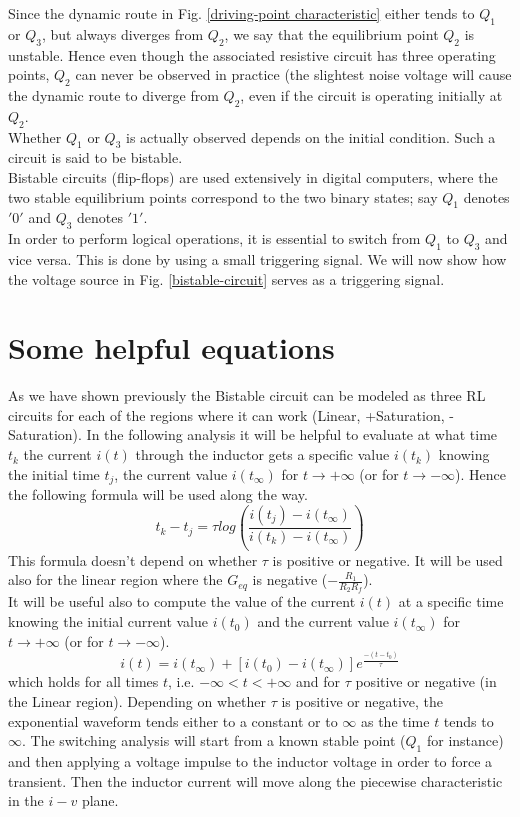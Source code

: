 \documentclass[12pt,a4paper,tweside,onehalfspacing]{article}
\begin{document}
Since the dynamic route in Fig. \ref{driving-point characteristic} either tends to $Q_1$ or $Q_3$, but always diverges from $Q_2$, we say that the equilibrium point $Q_2$ is unstable. Hence even though the associated resistive circuit has three operating points, $Q_2$ can never be observed in practice (the slightest noise voltage will cause the dynamic route to diverge from $Q_2$, even if the circuit is operating initially at $Q_2$.\\
Whether $Q_1$ or $Q_3$ is actually observed depends on the initial condition. Such a circuit is said to be bistable.\\
Bistable circuits (flip-flops) are used extensively in digital computers, where the two stable equilibrium points correspond to the two binary states; say $Q_1$ denotes $'0'$ and $Q_3$ denotes $'1'$.\\
In order to perform logical operations, it is essential to switch from $Q_1$ to $Q_3$ and vice versa. This is done by using a small triggering signal. We will now show how the voltage source in Fig. \ref{bistable-circuit} serves as a triggering signal.

\section{Some helpful equations}
As we have shown previously the Bistable circuit can be modeled as three RL circuits for each of the regions where it can work (Linear, +Saturation, -Saturation).
In the following analysis it will be helpful to evaluate at what time $t_k$ the current $i(t)$ through the inductor gets a specific value $i(t_k)$ knowing the initial time $t_j$, the current value $i(t_{\infty})$ for $t\rightarrow+\infty$ (or for $t\rightarrow-\infty$). Hence the following formula will be used along the way.
\begin{equation}\label{time-evaluation}
    t_k - t_j=\tau log \left(\frac{i(t_j)-i(t_{\infty})}{i(t_k)-i(t_{\infty})}\right)
\end{equation}
This formula doesn't depend on whether $\tau$ is positive or negative. It will be used also for the linear region where the $G_{eq}$ is negative ($-\frac{R_1}{R_2 R_f}$).\\
It will be useful also to compute the value of the current $i(t)$ at a specific time knowing the initial current value $i(t_0)$ and the current value $i(t_{\infty})$ for $t\rightarrow+\infty$ (or for $t\rightarrow-\infty$).
\begin{equation}
    i(t)=i(t_{\infty}) + [i(t_0)-i(t_{\infty})]e^{\frac{-(t-t_0)}{\tau}}
\end{equation}
which holds for all times $t$, i.e. $-\infty < t < +\infty$ and for $\tau$ positive or negative (in the Linear region).
Depending on whether $\tau$ is positive or negative, the exponential waveform tends either to a constant or to $\infty$ as the time $t$ tends to $\infty$.
The switching analysis will start from a known stable point ($Q_1$ for instance) and then applying a voltage impulse to the inductor voltage in order to force a transient. Then the inductor current will move along the piecewise characteristic in the $i-v$ plane.
%
\end{document}
